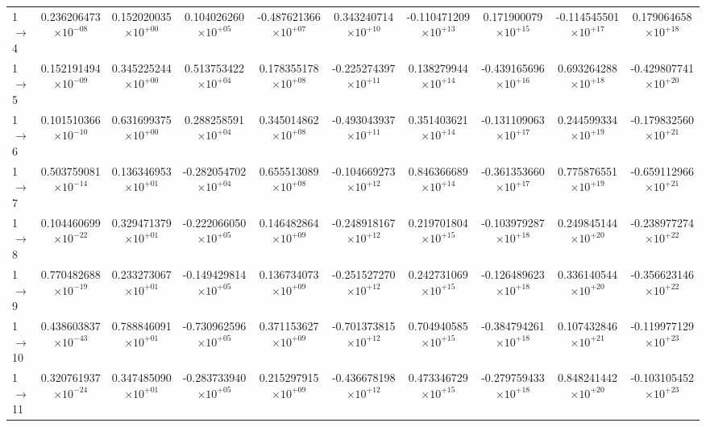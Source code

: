 \documentclass[reviewcopy]{elsarticle}
\begin{document}
\begin{landscape}
\begin{longtable}{lccccccccc}
1 $\to$ 4  & 0.236206473$\times10^{-08}$  & 0.152020035$\times10^{+00}$  & 0.104026260$\times10^{+05}$  & -0.487621366$\times10^{+07}$  & 0.343240714$\times10^{+10}$  & -0.110471209$\times10^{+13}$  & 0.171900079$\times10^{+15}$  & -0.114545501$\times10^{+17}$  & 0.179064658$\times10^{+18}$ \\
1 $\to$ 5  & 0.152191494$\times10^{-09}$  & 0.345225244$\times10^{+00}$  & 0.513753422$\times10^{+04}$  & 0.178355178$\times10^{+08}$  & -0.225274397$\times10^{+11}$  & 0.138279944$\times10^{+14}$  & -0.439165696$\times10^{+16}$  & 0.693264288$\times10^{+18}$  & -0.429807741$\times10^{+20}$ \\
1 $\to$ 6  & 0.101510366$\times10^{-10}$  & 0.631699375$\times10^{+00}$  & 0.288258591$\times10^{+04}$  & 0.345014862$\times10^{+08}$  & -0.493043937$\times10^{+11}$  & 0.351403621$\times10^{+14}$  & -0.131109063$\times10^{+17}$  & 0.244599334$\times10^{+19}$  & -0.179832560$\times10^{+21}$ \\
1 $\to$ 7  & 0.503759081$\times10^{-14}$  & 0.136346953$\times10^{+01}$  & -0.282054702$\times10^{+04}$  & 0.655513089$\times10^{+08}$  & -0.104669273$\times10^{+12}$  & 0.846366689$\times10^{+14}$  & -0.361353660$\times10^{+17}$  & 0.775876551$\times10^{+19}$  & -0.659112966$\times10^{+21}$ \\
1 $\to$ 8  & 0.104460699$\times10^{-22}$  & 0.329471379$\times10^{+01}$  & -0.222066050$\times10^{+05}$  & 0.146482864$\times10^{+09}$  & -0.248918167$\times10^{+12}$  & 0.219701804$\times10^{+15}$  & -0.103979287$\times10^{+18}$  & 0.249845144$\times10^{+20}$  & -0.238977274$\times10^{+22}$ \\
1 $\to$ 9  & 0.770482688$\times10^{-19}$  & 0.233273067$\times10^{+01}$  & -0.149429814$\times10^{+05}$  & 0.136734073$\times10^{+09}$  & -0.251527270$\times10^{+12}$  & 0.242731069$\times10^{+15}$  & -0.126489623$\times10^{+18}$  & 0.336140544$\times10^{+20}$  & -0.356623146$\times10^{+22}$ \\
1 $\to$ 10  & 0.438603837$\times10^{-43}$  & 0.788846091$\times10^{+01}$  & -0.730962596$\times10^{+05}$  & 0.371153627$\times10^{+09}$  & -0.701373815$\times10^{+12}$  & 0.704940585$\times10^{+15}$  & -0.384794261$\times10^{+18}$  & 0.107432846$\times10^{+21}$  & -0.119977129$\times10^{+23}$ \\
1 $\to$ 11  & 0.320761937$\times10^{-24}$  & 0.347485090$\times10^{+01}$  & -0.283733940$\times10^{+05}$  & 0.215297915$\times10^{+09}$  & -0.436678198$\times10^{+12}$  & 0.473346729$\times10^{+15}$  & -0.279759433$\times10^{+18}$  & 0.848241442$\times10^{+20}$  & -0.103105452$\times10^{+23}$ \\

\end{longtable}
\end{landscape}
\end{document}
